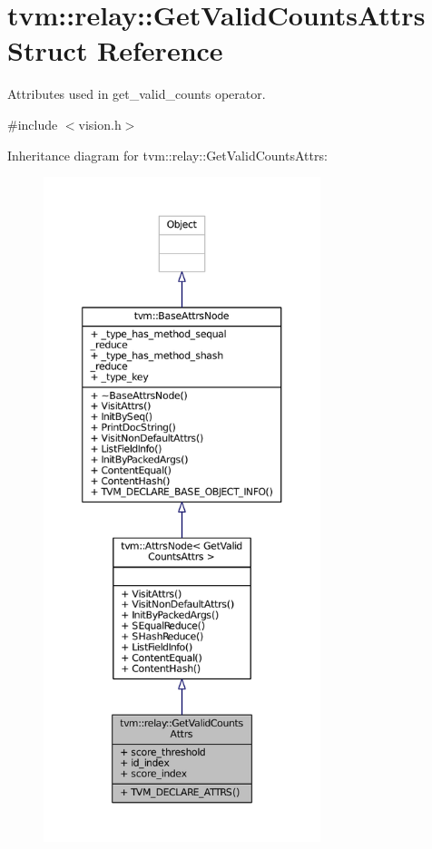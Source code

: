 \hypertarget{structtvm_1_1relay_1_1GetValidCountsAttrs}{}\section{tvm\+:\+:relay\+:\+:Get\+Valid\+Counts\+Attrs Struct Reference}
\label{structtvm_1_1relay_1_1GetValidCountsAttrs}


Attributes used in get\+\_\+valid\+\_\+counts operator.  




{\ttfamily \#include $<$vision.\+h$>$}



Inheritance diagram for tvm\+:\+:relay\+:\+:Get\+Valid\+Counts\+Attrs\+:
\nopagebreak
\begin{figure}[H]
\begin{center}
\leavevmode
\includegraphics[height=550pt]{structtvm_1_1relay_1_1GetValidCountsAttrs__inherit__graph}
\end{center}
\end{figure}


